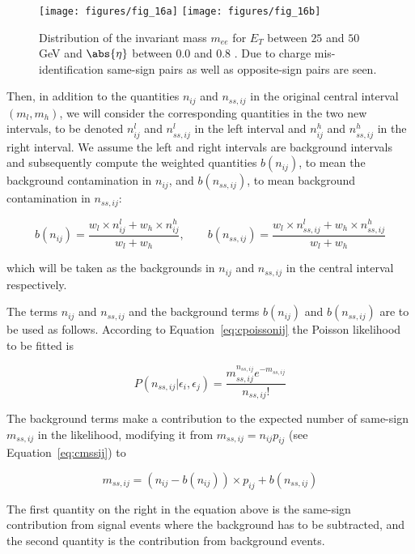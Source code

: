 \begin{figure}[H]
	\texttt{[image: figures/fig\_16a]}
	\texttt{[image: figures/fig\_16b]}
	\centering

	\caption{Distribution of the invariant mass $m_{ee}$ for $E_T$ between $25$
		and $50$ GeV and $\abs{\eta} $ between $0.0$ and $0.8$ \cite{atlaselcid}. Due
		to charge mis-identification same-sign pairs as well as opposite-sign pairs
		are seen.}

	\label{f:meea}

\end{figure}


Then, in addition to the quantities $n_{ij}$ and $n_{ss,ij}$ in the original
central interval $(m_l, m_h)$, we will consider the corresponding quantities in
the two new intervals, to be denoted $n_{ij}^l$ and $n_{ss,ij}^l$ in the left
interval and $n_{ij}^h$ and $n_{ss,ij}^h$ in the right interval. We assume the
left and right intervals are background intervals and subsequently compute the
weighted quantities $b(n_{ij})$, to mean the background contamination in
$n_{ij}$, and $b(n_{ss,ij})$, to mean background contamination in $n_{ss,ij}$:

$$
	b(n_{ij}) = \frac{w_l\times n_{ij}^l + w_h\times n_{ij}^h}{w_l + w_h}, \qquad
	b(n_{ss,ij})= \frac{w_l\times n_{ss,ij}^l + w_h \times n_{ss,ij}^h }{w_l + w_h}
$$

which will be taken as the backgrounds in $n_{ij}$ and $n_{ss,ij}$ in the
central interval respectively.

The terms $n_{ij}$ and $n_{ss,ij}$ and the background terms $b(n_{ij})$ and
$b(n_{ss,ij})$ are to be used as follows. According to
Equation~\ref{eq:cpoissonij} the Poisson likelihood to be fitted is

$$
	P(n_{ss,ij} | \epsilon_i, \epsilon_j) = \frac{m_{ss,ij}^{n_{ss,ij}} e^{-m_{ss,ij}}}{n_{ss,ij}!}
$$

The background terms make a contribution to the expected number of same-sign
$m_{ss,ij}$ in the likelihood, modifying it from $m_{ss,ij} = n_{ij} p_{ij}$
(see Equation~\ref{eq:cmssij}) to

$$
	m_{ss,ij} = (n_{ij} - b(n_{ij})) \times p_{ij} + b(n_{ss,ij})
$$

The first quantity on the right in the equation above is the same-sign
contribution from signal events where the background has to be subtracted, and
the second quantity is the contribution from background events.

